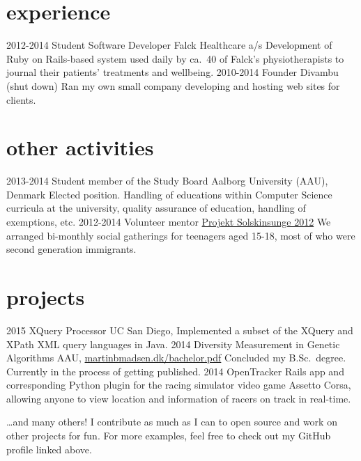 \documentclass{afriggeri-cv/friggeri-cv}
\newcommand{\aau}{%
  Aalborg University (AAU), Denmark
}
\begin{document}
\section{experience}

\begin{entrylist}
  \entry
    {2012-2014}
    {Student Software Developer}
    {Falck Healthcare a/s}
    {Development of Ruby on Rails-based system used daily by ca.\ 40 of Falck's physiotherapists to journal their patients' treatments and wellbeing.}
  \entry
    {2010-2014}
    {Founder}
    {Divambu (shut down)}
    {Ran my own small company developing and hosting web sites for clients.}
\end{entrylist}

\section{other activities}
\begin{entrylist}
  \entry
    {2013-2014}
    {Student member of the Study Board}
    {\aau}
    {Elected position. Handling of educations within Computer Science curricula at the university, quality assurance of education, handling of exemptions, etc.}
  \entry
    {2012-2014}
    {Volunteer mentor}
    {\href{http://www.urk.dk/hvad-goer-vi/mentoring-og-raadgivning/solskinsunge/}{Projekt Solskinsunge 2012}}
    {We arranged bi-monthly social gatherings for teenagers aged 15-18, most of who were second generation immigrants.}
\end{entrylist}

\section{projects}
\begin{entrylist}
  \entry
    {2015}
    {XQuery Processor}
    {UC San Diego, }
    {Implemented a subset of the XQuery and XPath XML query languages in Java.}
  \entry
    {2014}
    {Diversity Measurement in Genetic Algorithms}
    {AAU, \href{http://martinbmadsen.dk/bachelor.pdf}{martinbmadsen.dk/bachelor.pdf}}
    {Concluded my B.Sc.\ degree. Currently in the process of getting published.}
  \entry
    {2014}
    {OpenTracker}
    {}
    {Rails app and corresponding Python plugin for the racing simulator video game Assetto Corsa, allowing anyone to view location and information of racers on track in real-time.}
\end{entrylist}

\dots and many others! I contribute as much as I can to open source and work on other projects for fun. For more examples, feel free to check out my GitHub profile linked above.
\end{document}

